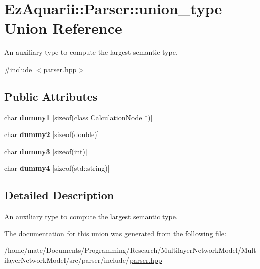\hypertarget{unionEzAquarii_1_1Parser_1_1union__type}{}\section{Ez\+Aquarii\+:\+:Parser\+:\+:union\+\_\+type Union Reference}
\label{unionEzAquarii_1_1Parser_1_1union__type}


An auxiliary type to compute the largest semantic type.  




{\ttfamily \#include $<$parser.\+hpp$>$}

\subsection*{Public Attributes}
\begin{DoxyCompactItemize}
\item 
char {\bfseries dummy1} \mbox{[}sizeof(class \hyperlink{classCalculationNode}{Calculation\+Node} $\ast$)\mbox{]}\hypertarget{unionEzAquarii_1_1Parser_1_1union__type_a8dc1c487beaaea42f7e707e6b58fe558}{}\label{unionEzAquarii_1_1Parser_1_1union__type_a8dc1c487beaaea42f7e707e6b58fe558}

\item 
char {\bfseries dummy2} \mbox{[}sizeof(double)\mbox{]}\hypertarget{unionEzAquarii_1_1Parser_1_1union__type_a7f2c4f1d701cacda3f26062a6078608e}{}\label{unionEzAquarii_1_1Parser_1_1union__type_a7f2c4f1d701cacda3f26062a6078608e}

\item 
char {\bfseries dummy3} \mbox{[}sizeof(int)\mbox{]}\hypertarget{unionEzAquarii_1_1Parser_1_1union__type_ad046a9b9880ea1f74733ee8010dfdabe}{}\label{unionEzAquarii_1_1Parser_1_1union__type_ad046a9b9880ea1f74733ee8010dfdabe}

\item 
char {\bfseries dummy4} \mbox{[}sizeof(std\+::string)\mbox{]}\hypertarget{unionEzAquarii_1_1Parser_1_1union__type_a3be232be35298c96ff84e73bd6cf931e}{}\label{unionEzAquarii_1_1Parser_1_1union__type_a3be232be35298c96ff84e73bd6cf931e}

\end{DoxyCompactItemize}


\subsection{Detailed Description}
An auxiliary type to compute the largest semantic type. 

The documentation for this union was generated from the following file\+:\begin{DoxyCompactItemize}
\item 
/home/mate/\+Documents/\+Programming/\+Research/\+Multilayer\+Network\+Model/\+Multilayer\+Network\+Model/src/parser/include/\hyperlink{parser_8hpp}{parser.\+hpp}\end{DoxyCompactItemize}
